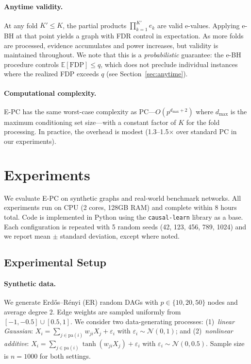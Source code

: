 \documentclass[11pt]{article}
\newcommand{\epc}{\textsc{E-PC}}
\newcommand{\E}{\mathbb{E}}
\begin{document}
\paragraph{Anytime validity.}
At any fold $K' \leq K$, the partial products $\prod_{k=1}^{K'} e_k$ are valid e-values. Applying e-BH at that point yields a graph with FDR control in expectation. As more folds are processed, evidence accumulates and power increases, but validity is maintained throughout. We note that this is a \emph{probabilistic} guarantee: the e-BH procedure controls $\E[\text{FDP}] \leq q$, which does not preclude individual instances where the realized FDP exceeds $q$ (see Section~\ref{sec:anytime}).

\paragraph{Computational complexity.}
\epc{} has the same worst-case complexity as PC---$O(p^{d_{\max}+2})$ where $d_{\max}$ is the maximum conditioning set size---with a constant factor of $K$ for the fold processing. In practice, the overhead is modest (1.3--1.5$\times$ over standard PC in our experiments).

\section{Experiments}
\label{sec:experiments}

We evaluate \epc{} on synthetic graphs and real-world benchmark networks. All experiments run on CPU (2 cores, 128GB RAM) and complete within 8 hours total. Code is implemented in Python using the \texttt{causal-learn} library as a base. Each configuration is repeated with 5 random seeds (42, 123, 456, 789, 1024) and we report mean $\pm$ standard deviation, except where noted.

\subsection{Experimental Setup}

\paragraph{Synthetic data.}
We generate Erd\H{o}s--R\'{e}nyi (ER) random DAGs with $p \in \{10, 20, 50\}$ nodes and average degree 2. Edge weights are sampled uniformly from $[-1, -0.5] \cup [0.5, 1]$. We consider two data-generating processes: (1)~\emph{linear Gaussian}: $X_i = \sum_{j \in \text{pa}(i)} w_{ji} X_j + \varepsilon_i$ with $\varepsilon_i \sim \mathcal{N}(0, 1)$; and (2)~\emph{nonlinear additive}: $X_i = \sum_{j \in \text{pa}(i)} \tanh(w_{ji} X_j) + \varepsilon_i$ with $\varepsilon_i \sim \mathcal{N}(0, 0.5)$. Sample size is $n = 1000$ for both settings.
\end{document}
